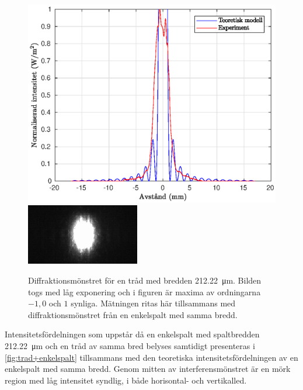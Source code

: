 \documentclass[a4paper]{article}
\begin{document}
\begin{figure}[h!]
	\centering
	\includegraphics[width=0.75\linewidth]{Data/Figurer/tradLagExpo.eps}
	\includegraphics[width=0.5\linewidth]{Data/Figurer/tradLagExpo.png}
	\caption{Diffraktionsmönstret för en tråd med bredden \SI{212.22}{\micro\m}. Bilden togs med låg exponering och i figuren är maxima av ordningarna $-1, 0$ och $1$ synliga. Mätningen ritas här tillsammans med diffraktionsmönstret från en enkelspalt med samma bredd.}
	\label{fig:tradLagExpo}
\end{figure}

\FloatBarrier

Intensitetsfördelningen som uppstår då en enkelspalt med spaltbredden \SI{212.22}{\micro\m} och en tråd av samma bred belyses samtidigt presenteras i \autoref{fig:trad+enkelspalt} tillsammans med den teoretiska intensitetsfördelningen av en enkelspalt med samma bredd. Genom mitten av interferensmönstret är en mörk region med låg intensitet syndlig, i både horisontal- och vertikalled.

\FloatBarrier
\end{document}
